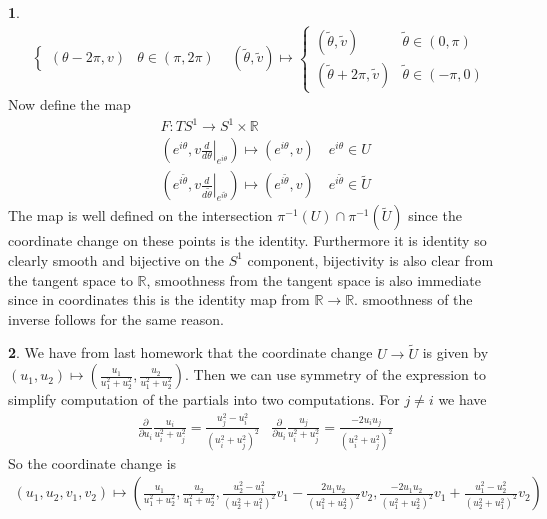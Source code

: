 \documentclass[10.5pt]{article}
\theoremstyle{definition}
\newtheorem{pb}{}
\begin{document}
\begin{pb}
\begin{align*}
\begin{cases}
                (\theta - 2\pi,v) & \theta \in (\pi,2\pi)
            \end{cases}
            &(\tilde{\theta}, \tilde{v}) \mapsto \begin{cases}
                (\tilde{\theta},\tilde{v}) & \tilde{\theta} \in (0, \pi) \\
                (\tilde{\theta} + 2\pi,\tilde{v}) & \tilde{\theta} \in (-\pi,0)
            \end{cases}
        \end{align*}
        Now define the map
        \begin{align*}
            &F: TS^1 \to S^1 \times \mathbb{R} \\
            &\left(e^{i\theta},\left.v\frac{d}{d\theta}\right\vert_{e^{i\theta}} \right) \mapsto (e^{i\theta},v) \quad e^{i \theta} \in U \\
            &\left(e^{i\tilde{\theta}},\left.v\frac{d}{d\tilde{\theta}}\right\vert_{e^{i\tilde{\theta}}} \right) \mapsto (e^{i\tilde{\theta}},v) \quad e^{i \tilde{\theta}} \in \tilde{U}
        \end{align*}
        The map is well defined on the intersection \(\pi^{-1}(U) \cap \pi^{-1}(\tilde{U})\) since the coordinate change on these points is the identity. Furthermore it is identity so clearly 
        smooth and bijective on the \(S^1\) component,
        bijectivity is also clear from the tangent space to \(\mathbb{R}\), smoothness from the tangent space is also immediate since in coordinates this is the identity map from \(\mathbb{R} \to \mathbb{R}\).
       smoothness of the inverse follows for the same reason.
    \end{pb}
    \begin{pb}
        We have from last homework that the coordinate change \(U \to \tilde{U}\) is given by \((u_1,u_2) \mapsto (\frac{u_1}{u_1^2 + u_2^2},\frac{u_2}{u_1^2 + u_2^2})\).
        Then we can use symmetry of the expression to simplify computation of the partials into two computations. For \(j \neq i\) we have
        \begin{align*}
            &\frac{\partial}{\partial u_i} \frac{u_i}{u_i^2 + u_j^2} = \frac{u_j^2 - u_i^2}{(u_i^2 + u_j^2)^2} 
            &\frac{\partial}{\partial u_i} \frac{u_j}{u_i^2 + u_j^2} = \frac{-2u_iu_j}{(u_i^2 + u_j^2)^2}
        \end{align*}
        So the coordinate change is
        \begin{align*}
            (u_1,u_2,v_1,v_2) \mapsto 
            \left(\frac{u_1}{u_1^2 + u_2^2},\frac{u_2}{u_1^2 + u_2^2},
            \frac{u_2^2 - u_1^2}{(u_2^2 + u_1^2)^2}v_1 - \frac{2u_1u_2}{(u_1^2+u_2^2)^2}v_2,
            \frac{-2u_1u_2}{(u_1^2 + u_2^2)^2}v_1 + \frac{u_1^2 - u_2^2}{(u_2^2 + u_1^2)^2}v_2\right)
        \end{align*}
    \end{pb}
\end{document}
